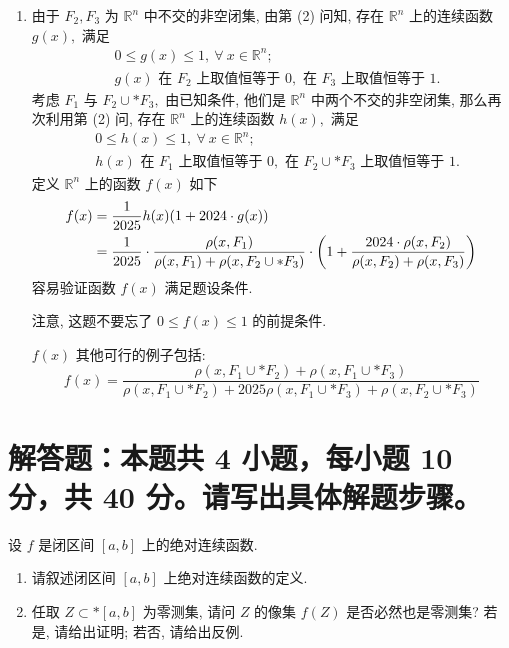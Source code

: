 \begin{solution}
\begin{enumerate}
\item 由于 $F_2, F_3$ 为 $\mathbb{R}^n$ 中不交的非空闭集, 由第 (2) 问知, 存在 $\mathbb{R}^n$ 上的连续函数 $g(x),$ 满足
\begin{align*}
& 0 \leqslant g(x) \leqslant 1, ~ \forall ~ x \in \mathbb{R}^n; \\
& \text{$g(x)$ 在 $F_2$ 上取值恒等于 $0,$ 在 $F_3$ 上取值恒等于 $1.$}
\end{align*}
考虑 $F_1$ 与 $F_2 \cup* F_3,$ 由已知条件, 他们是 $\mathbb{R}^n$ 中两个不交的非空闭集, 那么再次利用第 (2) 问, 存在 $\mathbb{R}^n$ 上的连续函数 $h(x),$ 满足
\begin{align*}
& 0 \leqslant h(x) \leqslant 1, ~ \forall ~ x \in \mathbb{R}^n; \\
& \text{$h(x)$ 在 $F_1$ 上取值恒等于 $0,$ 在 $F_2 \cup* F_3$ 上取值恒等于 $1.$}
\end{align*}
定义 $\mathbb{R}^n$ 上的函数 $f(x)$ 如下
\begin{align*}
f(x) & = \dfrac{1}{2025} h(x) (1 + 2024 \cdot g(x)) \score{5} \\
& = \dfrac{1}{2025} \cdot \dfrac{\rho(x, F_1)}{\rho(x, F_1) + \rho(x, F_2 \cup* F_3)} \cdot \left( 1 + \dfrac{2024 \cdot \rho(x, F_2)}{\rho(x, F_2) + \rho(x, F_3)} \right)
\end{align*}
容易验证函数 $f(x)$ 满足题设条件.

注意, 这题不要忘了 $0 \leqslant f(x) \leqslant 1$ 的前提条件.

$f(x)$ 其他可行的例子包括:
\begin{equation*}
f(x) = \dfrac{\rho(x, F_1\cup* F_2) + \rho(x, F_1\cup* F_3)}{\rho(x, F_1\cup* F_2) + 2025 \rho(x, F_1\cup* F_3) + \rho(x, F_2\cup* F_3)}
\end{equation*}
\end{enumerate}
\end{solution}


\section{解答题：本题共 4 小题，每小题 10 分，共 40 分。请写出具体解题步骤。}


\begin{question}[points = 10]设 $f$ 是闭区间 $[a, b]$ 上的绝对连续函数.
\begin{enumerate}
\item 请叙述闭区间 $[a, b]$ 上绝对连续函数的定义.
\item 任取 $Z \subset* [a, b]$ 为零测集, 请问 $Z$ 的像集 $f(Z)$ 是否必然也是零测集? 若是, 请给出证明; 若否, 请给出反例.
\end{enumerate}

\end{question}

